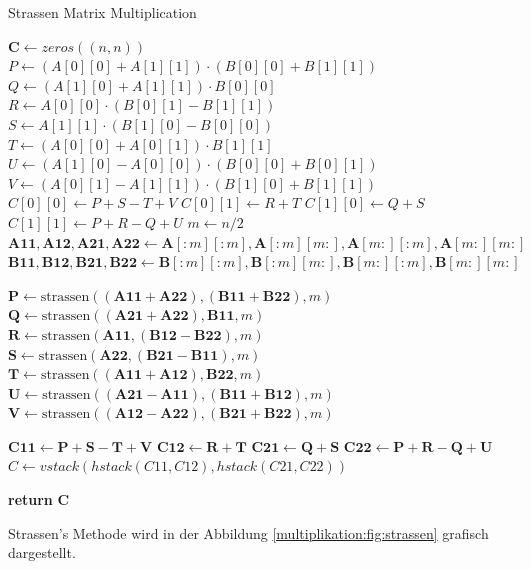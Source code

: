 \begin{algorithm}\footnotesize\caption{Strassen Matrix Multiplication}
	\label{multiplikation:alg:strassen}
	\setlength{\lineskip}{7pt}
	\begin{algorithmic}
		\State  $ \mathbf{C} \gets zeros((n, n))$
		\State $P  \gets (A[0][0]+A[1][1])\cdot( B[0][0]+B[1][1])$
		\State   $Q  \gets (A[1][0]+A[1][1])\cdot B[0][0]$
		\State   $R  \gets A[0][0]\cdot (B[0][1]-B[1][1])$
		\State   $S  \gets A[1][1]\cdot (B[1][0]-B[0][0])$
		\State   $T  \gets (A[0][0]+A[0][1])\cdot B[1][1]$
		\State   $U  \gets (A[1][0]-A[0][0])\cdot (B[0][0]+B[0][1])$
		\State   $V  \gets (A[0][1]-A[1][1])\cdot (B[1][0]+B[1][1])$
		\State   $C[0][0]  \gets P+S-T+V$
		\State   $C[0][1]  \gets R+T$
		\State   $C[1][0]  \gets Q+S$
		\State   $C[1][1]  \gets P+R-Q+U$
		\Else
		\State  $ m \gets n/2$
		\State $\mathbf{A11}, \mathbf{A12}, \mathbf{A21}, \mathbf{A22} \gets \mathbf{A}[:m][:m], \mathbf{A}[:m][m:], \mathbf{A}[m:][:m], \mathbf{A}[m:][m:]$
		\State $\mathbf{B11}, \mathbf{B12}, \mathbf{B21}, \mathbf{B22} \gets \mathbf{B}[:m][:m], \mathbf{B}[:m][m:], \mathbf{B}[m:][:m], \mathbf{B}[m:][m:]$

		\State $ \mathbf{P} \gets \text{strassen}((\mathbf{A11}+ \mathbf{A22}),(\mathbf{B11}+\mathbf{B22}), m)$
		\State $ \mathbf{Q} \gets \text{strassen}((\mathbf{A21}+ \mathbf{A22}), \mathbf{B11},m)$
		\State $ \mathbf{R} \gets \text{strassen}( \mathbf{A11},(\mathbf{B12}-  \mathbf{B22}),m)$
		\State $ \mathbf{S} \gets \text{strassen}( \mathbf{A22},(\mathbf{B21}-  \mathbf{B11}),m)$
		\State $ \mathbf{T} \gets \text{strassen}((\mathbf{A11}+ \mathbf{A12}), \mathbf{B22},m)$
		\State $ \mathbf{U} \gets \text{strassen}((\mathbf{A21}- \mathbf{A11}),(\mathbf{B11}+\mathbf{B12}),m)$
		\State $ \mathbf{V} \gets \text{strassen}((\mathbf{A12}- \mathbf{A22}),(\mathbf{B21}+\mathbf{B22}),m)$



		\State   $\mathbf{C11}  \gets \mathbf{P+S-T+V}$
		\State   $\mathbf{C12}  \gets \mathbf{R+T}$
		\State   $\mathbf{C21}  \gets \mathbf{Q+S}$
		\State   $\mathbf{C22}  \gets \mathbf{P+R-Q+U}$
		\State $  C \gets vstack(hstack(C11, C12), hstack(C21, C22))$

		\EndIf
		\State \textbf{return} $\textbf{C}$

		\EndFunction
	\end{algorithmic}
\end{algorithm}
Strassen's Methode wird in der Abbildung \ref{multiplikation:fig:strassen} grafisch dargestellt.
